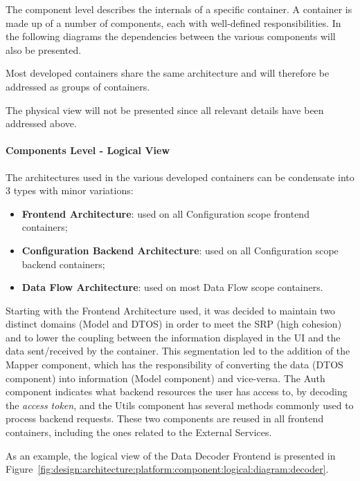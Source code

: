 The component level describes the internals of a specific container. A container is made up of a number of components, each with well-defined responsibilities. In the following diagrams the dependencies between the various components will also be presented.

Most developed containers share the same architecture and will therefore be addressed as groups of containers.

The physical view will not be presented since all relevant details have been addressed above.

\paragraph{Components Level - Logical View}
\label{par:design:architecture:platform:components:logical}

The architectures used in the various developed containers can be condensate into 3 types with minor variations:

\begin{itemize}
   \item \textbf{Frontend Architecture}: used on all Configuration scope frontend containers;
   \item \textbf{Configuration Backend Architecture}: used on all Configuration scope backend containers;
   \item \textbf{Data Flow Architecture}: used on most Data Flow scope containers.
\end{itemize}

Starting with the Frontend Architecture used, it was decided to maintain two distinct domains (Model and DTOS) in order to meet the \gls{SRP} (high cohesion) and to lower the coupling between the information displayed in the UI and the data sent/received by the container. This segmentation led to the addition of the Mapper component, which has the responsibility of converting the data (DTOS component) into information (Model component) and vice-versa. The Auth component indicates what backend resources the user has access to, by decoding the \textit{access token}, and the Utils component has several methods commonly used to process backend requests. These two components are reused in all frontend containers, including the ones related to the External Services.

As an example, the logical view of the Data Decoder Frontend is presented in Figure~\ref{fig:design:architecture:platform:component:logical:diagram:decoder}.

